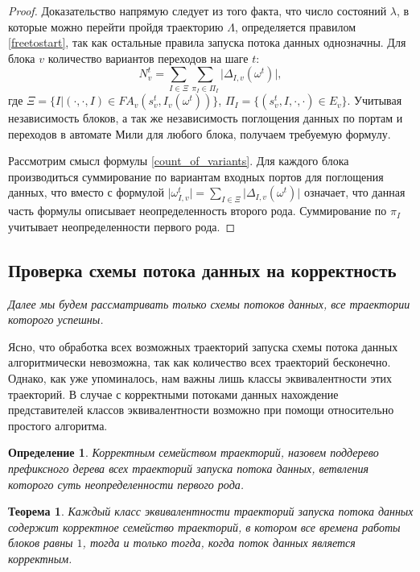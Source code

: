 \documentclass[10pt,a4paper]{article}
\newtheorem{defen}{Определение}
\newtheorem{theorem}{Теорема}
\newcommand{\FA}{F\!A}
\begin{document}
  \begin{proof}
    Доказательство напрямую следует из того факта, что число состояний $\lambda$, в которые можно перейти пройдя траекторию $\Lambda$,
    определяется правилом \eqref{freetostart}, так как остальные правила запуска потока данных однозначны.
    Для блока $v$ количество вариантов переходов на шаге $t$:
    \begin{equation}
      N^t_v = \sum_{I \in \Xi} \sum_{\pi_I \in \Pi_I} \lvert \Delta_{I, v}(\omega^t) \rvert, \label{count_of_variants}    
    \end{equation}
    где $\Xi = \{ I \vert (\cdot, \cdot, I) \in \FA_v(s^t_v, I_v(\omega^t)) \}$, $\Pi_I = \{(s^t_v, I, \cdot, \cdot) \in E_v\}$.
    Учитывая независимость блоков, а так же независимость поглощения данных по портам и переходов в автомате Мили для любого блока, получаем требуемую формулу.
    
    Рассмотрим смысл формулы \eqref{count_of_variants}. Для каждого блока производиться суммирование по вариантам входных портов для поглощения данных, что вместо с формулой
    $\lvert \omega^t_{I, v} \rvert = \sum_{I \in \Xi} \lvert \Delta_{I, v}(\omega^t) \rvert$ означает, что данная часть формулы описывает неопределенность второго рода.
    Суммирование по $\pi_I$ учитывает неопределенности первого рода.
  \end{proof}
  
\subsection{Проверка схемы потока данных на корректность}
  \textit{Далее мы будем рассматривать только схемы потоков данных, все траектории которого успешны.}
 
  Ясно, что обработка всех возможных траекторий запуска схемы потока данных алгоритмически невозможна, так как количество всех траекторий бесконечно.
  Однако, как уже упоминалось, нам важны лишь классы эквивалентности этих траекторий. В случае с корректными потоками данных нахождение
  представителей классов эквивалентности возможно при помощи относительно простого алгоритма.
  
  \begin{defen}
    Корректным семейством траекторий, назовем поддерево префиксного дерева всех траекторий запуска потока данных, ветвления которого суть неопределенности первого рода.
  \end{defen}
  
  \begin{theorem}
    \label{soundness_check}
    Каждый класс эквивалентности траекторий запуска потока данных содержит корректное семейство траекторий, в котором все времена работы блоков равны $1$,
    тогда и только тогда, когда поток данных является корректным.
  \end{theorem}
  
\end{document}
